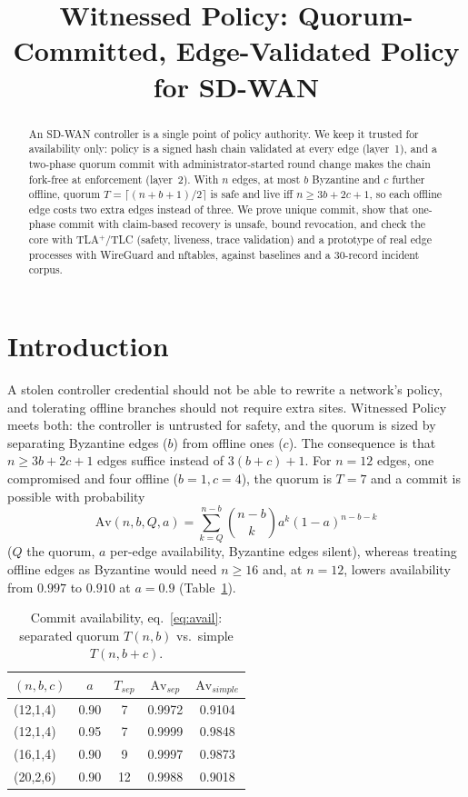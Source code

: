 \documentclass[conference]{IEEEtran}
\newcommand{\Av}{\mathrm{Av}}
\begin{document}
\title{Witnessed Policy: Quorum-Committed, Edge-Validated Policy for SD-WAN}
\author{
}
\maketitle

\begin{abstract}
An SD-WAN controller is a single point of policy authority. We keep it trusted for availability only: policy is a signed hash chain validated at every edge (layer~1), and a two-phase quorum commit with administrator-started round change makes the chain fork-free at enforcement (layer~2). With $n$ edges, at most $b$ Byzantine and $c$ further offline, quorum $T=\lceil (n+b+1)/2\rceil$ is safe and live iff $n\ge 3b+2c+1$, so each offline edge costs two extra edges instead of three. We prove unique commit, show that one-phase commit with claim-based recovery is unsafe, bound revocation, and check the core with TLA$^+$/TLC (safety, liveness, trace validation) and a prototype of real edge processes with WireGuard and nftables, against baselines and a 30-record incident corpus.
\end{abstract}

\section{Introduction}
A stolen controller credential should not be able to rewrite a network's policy, and tolerating offline branches should not require extra sites. Witnessed Policy meets both: the controller is untrusted for safety, and the quorum is sized by separating Byzantine edges ($b$) from offline ones ($c$). The consequence is that $n\ge3b+2c+1$ edges suffice instead of $3(b{+}c)+1$. For $n{=}12$ edges, one compromised and four offline ($b{=}1,c{=}4$), the quorum is $T{=}7$ and a commit is possible with probability
\begin{equation}\label{eq:avail}
\Av(n,b,Q,a)=\sum_{k=Q}^{n-b}\binom{n-b}{k}a^k(1-a)^{n-b-k}
\end{equation}
($Q$ the quorum, $a$ per-edge availability, Byzantine edges silent), whereas treating offline edges as Byzantine would need $n\ge16$ and, at $n{=}12$, lowers availability from $0.997$ to $0.910$ at $a{=}0.9$ (Table~\ref{tab:avail}).
\begin{table}[b]
\centering\caption{Commit availability, eq.~\eqref{eq:avail}: separated quorum $T(n,b)$ vs.\ simple $T(n,b{+}c)$.}\label{tab:avail}
\begin{tabular}{@{}lcccc@{}}
\toprule
$(n,b,c)$ & $a$ & $T_{sep}$ & $\Av_{sep}$ & $\Av_{simple}$\\
\midrule
(12,1,4)& 0.90 & 7 & 0.9972 & 0.9104\\
(12,1,4)& 0.95 & 7 & 0.9999 & 0.9848\\
(16,1,4)& 0.90 & 9 & 0.9997 & 0.9873\\
(20,2,6)& 0.90 & 12 & 0.9988 & 0.9018\\
\bottomrule
\end{tabular}
\end{table}
\end{document}
